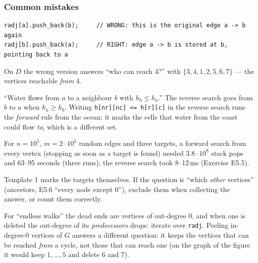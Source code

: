\subsubsection*{Common mistakes}

\begin{warningbox}
\begin{lstlisting}[style=snippet]
radj[a].push_back(b);     // WRONG: this is the original edge a -> b again
radj[b].push_back(a);     // RIGHT: edge a -> b is stored at b, pointing back to a
\end{lstlisting}
On $D$ the wrong version answers ``who can reach 4?'' with $\{3, 4, 1, 2, 5, 6, 7\}$ --- the vertices reachable \emph{from} 4.
\end{warningbox}

\begin{warningbox}
``Water flows from $a$ to a neighbour $b$ with $h_b \le h_a$.'' The reverse search goes from $b$ to $a$ when $h_a \ge h_b$. Writing \texttt{h[nr][nc] <= h[r][c]} in the reverse search runs the \emph{forward} rule from the ocean: it marks the cells that water from the coast could flow \emph{to}, which is a different set.
\end{warningbox}

\begin{warningbox}
For $n = 10^5$, $m = 2 \cdot 10^5$ random edges and three targets, a forward search from every vertex (stopping as soon as a target is found) needed $3.8 \cdot 10^8$ stack pops and 63--95 seconds (three runs); the reverse search took 8--12\,ms (Exercise E5.5).
\end{warningbox}

\begin{warningbox}
Template 1 marks the targets themselves. If the question is ``which \emph{other} vertices'' (ancestors, E5.6 ``every node except 0''), exclude them when collecting the answer, or count them correctly.
\end{warningbox}

\begin{warningbox}
For ``endless walks'' the dead ends are vertices of out-degree 0, and when one is deleted the out-degree of its \emph{predecessors} drops: iterate over \texttt{radj}. Peeling in-degree-0 vertices of $G$ answers a different question: it keeps the vertices that can be reached \emph{from} a cycle, not those that can reach one (on the graph of the figure it would keep $1, \dots, 5$ and delete 6 and 7).
\end{warningbox}

